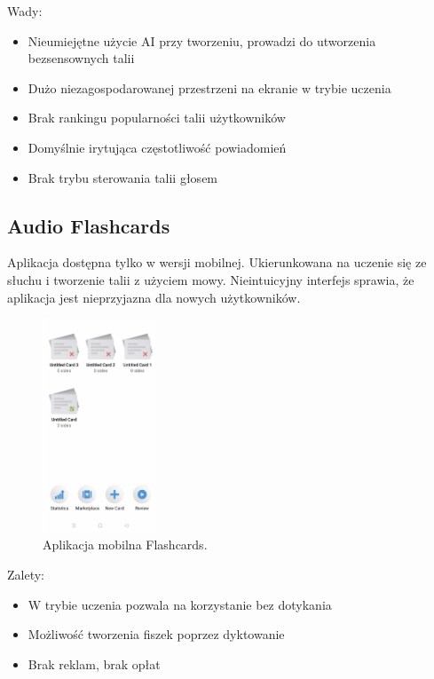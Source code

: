 Wady:
\begin{itemize}
    \item Nieumiejętne użycie AI przy tworzeniu, prowadzi do utworzenia bezsensownych talii
    \item Dużo niezagospodarowanej przestrzeni na ekranie w trybie uczenia
    \item Brak rankingu popularności talii użytkowników
    \item Domyślnie irytująca częstotliwość powiadomień
    \item Brak trybu sterowania talii głosem
\end{itemize}

\subsection{Audio Flashcards}

Aplikacja dostępna tylko w wersji mobilnej. Ukierunkowana na uczenie się ze słuchu i tworzenie talii z użyciem mowy. Nieintuicyjny interfejs sprawia, że aplikacja jest nieprzyjazna dla nowych użytkowników.

\begin{figure}[H]
    \centering
    \includegraphics[width=0.3\textwidth]{chapters/chapter_3/flashcards}
    \caption{Aplikacja mobilna Flashcards.}
    \label{img:flashcards}
\end{figure}

Zalety:
\begin{itemize}
    \item W trybie uczenia pozwala na korzystanie bez dotykania
    \item Możliwość tworzenia fiszek poprzez dyktowanie
    \item Brak reklam, brak opłat
\end{itemize}

